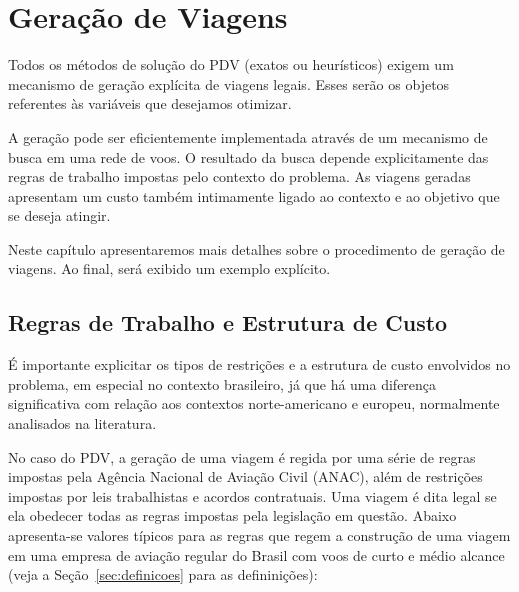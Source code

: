 \zerar
\chapter{Geração de Viagens}
\label{cap:geracao}

Todos os métodos de solução do PDV (exatos ou heurísticos) exigem um mecanismo de geração 
explícita de viagens legais. Esses serão os objetos referentes às variáveis que desejamos otimizar. 

A geração pode ser eficientemente implementada através de um mecanismo de busca em uma rede de voos. 
O resultado da busca depende explicitamente das regras de trabalho impostas pelo contexto do
problema. As viagens geradas apresentam um custo também intimamente ligado ao contexto e ao 
objetivo que se deseja atingir. 

Neste capítulo apresentaremos mais detalhes sobre o procedimento de geração de viagens. Ao final,
será exibido um exemplo explícito.


\section{Regras de Trabalho e Estrutura de Custo}
\label{sec:regras_e_custos}

É importante explicitar os tipos de restrições e a estrutura de custo envolvidos no problema, em 
especial no contexto brasileiro, já que há uma diferença significativa com relação aos contextos 
norte-americano e europeu, normalmente analisados na literatura.

No caso do PDV, a geração de uma viagem é regida por uma série de regras impostas pela Agência
Nacional de Aviação Civil (ANAC), além de restrições impostas por leis trabalhistas e acordos
contratuais. Uma viagem é dita legal se ela obedecer todas as regras impostas pela legislação em
questão. Abaixo apresenta-se valores típicos para as regras que regem a construção de uma viagem em
uma empresa de aviação regular do Brasil com voos de curto e médio alcance (veja a
Seção~\ref{sec:definicoes} para as defininições):

